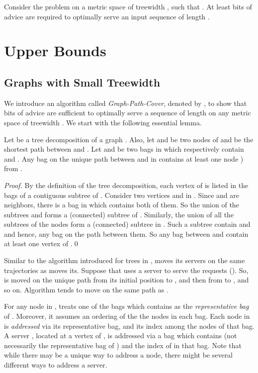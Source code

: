 \begin{theorem}\label{mainLowTreeWidth}
Consider the \ks problem on a metric space of treewidth , such that . At least  bits of advice are required to optimally serve an input sequence of length .
\end{theorem}
\section{Upper Bounds}

\subsection{Graphs with Small Treewidth}
We introduce an algorithm called \textit{Graph-Path-Cover}, denoted by \npc, to show that  bits of advice are sufficient to optimally serve a sequence of length  on any metric space of treewidth . We start with the following essential lemma. 

\begin{lemma} \label{lemmaMMT} Let  be a tree decomposition of a graph . Also, let  and  be two nodes of  and  be the shortest path between  and . Let  and  be two bags in  which respectively contain  and . Any bag on the unique path between  and  in  contains at least one node  ) from .
\end{lemma} 

\begin{proof}
By the definition of the tree decomposition, each vertex  of  is listed in the bags of a contiguous subtree  of . Consider two vertices  and  in . Since  and  are neighbors, there is a bag in  which contains both of them. So the union of the subtrees  and  forms a (connected) subtree of . Similarly, the union of all the subtrees of the nodes  form a (connected) subtree in . Such a subtree contain  and  and hence, any bag on the path between them. So any bag between  and  contain at least one vertex  of .\qed 
\end{proof}

Similar to the \pcv algorithm introduced for trees in \cite{WAOA11}, \npc moves its servers on the same trajectories as \opt moves its. Suppose that \OPT uses a server  to serve the requests  (). So,  is moved on the unique path from its initial position to , and then from  to , and so on. Algorithm \pcv tends to move  on the same path as \opt.

For any node  in , \npc treats one of the bags  which contains  as the \textit{representative bag} of . Moreover, it assumes an ordering of the the nodes in each bag. Each node in  is \textit{addressed} via 
its representative bag, and its index among the nodes of that bag. A server , located at a vertex  of , is addressed via a bag which contains  (not necessarily the representative bag of ) and the index of  in that bag. Note that while there may be a unique way to address a node, there might be several different ways to address a server.

